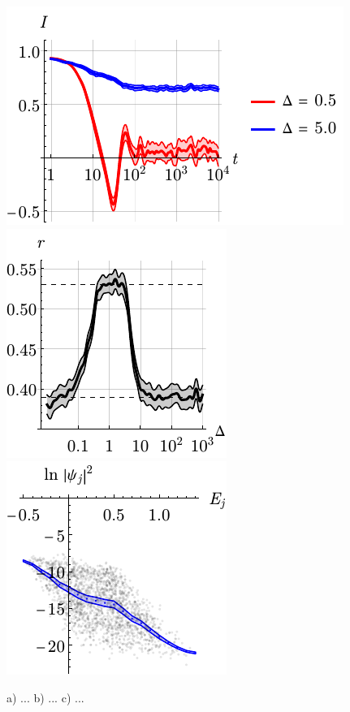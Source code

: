 \begin{figure}[h]
    \centering
    \includegraphics{imgs/2Dth_loc.pdf}
    \includegraphics{imgs/2Drdel.pdf}
    \includegraphics{imgs/2Dtherm_1.pdf}
    \caption{a) ... b) ... c) ... }
    \label{fig:2Dtherm}
\end{figure}


